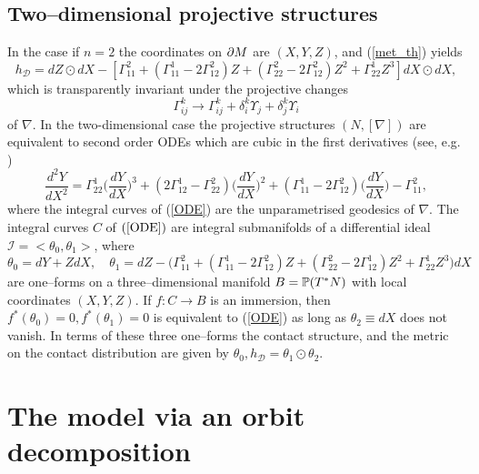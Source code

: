 \koniec

\subsection{Two--dimensional projective structures}
In the case if $n=2$ the coordinates on $\partial M$ are $(X, Y, Z)$,  and (\ref{met_th}) yields
\[
h_{\mathcal D}=dZ\odot dX-[\Gamma_{11}^2+(\Gamma_{11}^1-2\Gamma_{12}^2)Z+(\Gamma_{22}^2-2\Gamma_{12}^2)Z^2+
\Gamma_{22}^1Z^3]dX\odot dX,
\]
which is transparently invariant under the projective changes 
\[
\Gamma_{ij}^k\longrightarrow \Gamma_{ij}^k+\delta^k_i\Upsilon_j+\delta^k_j\Upsilon_i
\]
of $\nabla$.
In the  two-dimensional case the 
projective
structures $(N, [\nabla])$ are equivalent to second order ODEs which are cubic in
the first derivatives (see, e.g. \cite{BDE})
\begin{equation}
\label{ODE}
\frac{d^2 Y}{d X^2}=\Gamma^1_{22}\Big(\frac{d Y}{d X}\Big)^3
+(2\Gamma^1_{12}-\Gamma^2_{22})\Big(\frac{d Y}{d X}\Big)^2
+(\Gamma^1_{11}-2\Gamma^2_{12})\Big(\frac{d Y}{d X}\Big)-
\Gamma^2_{11},
\end{equation}
where the integral curves of (\ref{ODE}) are the unparametrised geodesics of $\nabla$. 
The integral curves $C$ of $(\ref{ODE})$ are integral submanifolds
of a  differential
ideal ${\mathcal I}=<\theta_0, \theta_1>$, where
\[
\theta_0=dY+ZdX, \quad \theta_1=dZ-\Big(\Gamma_{11}^2+(\Gamma_{11}^1-2\Gamma_{12}^2)Z+(\Gamma_{22}^2-2\Gamma_{12}^1)Z^2+
\Gamma_{22}^1Z^3\Big)dX
\]
are one--forms on a three--dimensional manifold $B=\mathbb{P}(T^*N)$ with local coordinates $(X, Y, Z)$. If $f:C\rightarrow B$ is an immersion, then $f^*(\theta_0)=0, f^*(\theta_1)=0$ is equivalent
to (\ref{ODE}) as long as $\theta_2\equiv dX$ does not vanish. In terms of these three one--forms
the contact structure, and the metric on the contact distribution are given by
$
\theta_0,  h_{\mathcal D}=\theta_1\odot\theta_2.
$



\section{The model via an orbit decomposition}

